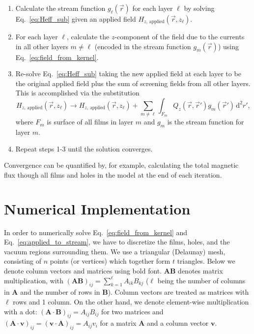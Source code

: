 \documentclass[final,3p,times]{elsarticle}
\begin{document}
\begin{enumerate}
    \item{
        Calculate the stream function $g_\ell(\vec{r})$ for each layer $\ell$ by solving Eq.~\ref{eq:Heff_sub} given an applied field $H_{z,\,\mathrm{applied}}(\vec{r}, z_\ell)$.
    }
    \item{
        For each layer $\ell$, calculate the $z$-component of the field due to the currents in all other layers $m\neq\ell$ (encoded in the stream function $g_m(\vec{r})$)
        using Eq.~\ref{eq:field_from_kernel}.
    }
    \item{
        Re-solve Eq.~\ref{eq:Heff_sub} taking the new applied field at each layer to be the original applied field plus the sum of screening fields from all other layers. This is accomplished via the substitution
        $$
            H_{z,\,\mathrm{applied}}(\vec{r}, z_\ell) \to
            H_{z,\,\mathrm{applied}}(\vec{r}, z_\ell)
            + \sum_{m\neq\ell}
            \int_{F_m} Q_z(\vec{r},\vec{r}')g_m(\vec{r}')\,\mathrm{d}^2r',
        $$
        where $F_m$ is surface of all films in layer $m$ and $g_m$ is the stream function for layer $m$.
    }
    \item{
        Repeat steps 1-3 until the solution converges.
    }
\end{enumerate}

Convergence can be quantified by, for example, calculating the total magnetic flux though all films and holes in the model at the end of each iteration.

\section{Numerical Implementation}
\label{section:implementation}

In order to numerically solve Eq.~\ref{eq:field_from_kernel} and Eq.~\ref{eq:applied_to_stream}, we have to discretize the films, holes, and the vacuum regions surrounding them. We use a triangular
(Delaunay) mesh, consisting of $n$ points (or vertices)
which together form $t$ triangles. Below we denote column vectors and matrices using bold font. $\mathbf{A}\mathbf{B}$
denotes matrix multiplication, with $(\mathbf{A}\mathbf{B})_{ij}=\sum_{k=1}^\ell A_{ik}B_{kj}$
($\ell$ being the number of columns in $\mathbf{A}$ and the number of rows in $\mathbf{B}$). Column vectors are treated as matrices with $\ell$ rows and 1 column. On the other hand, we denote element-wise multiplication with a dot: $(\mathbf{A}\cdot\mathbf{B})_{ij}=A_{ij}B_{ij}$ for two matrices
and $(\mathbf{A}\cdot\mathbf{v})_{ij}=(\mathbf{v}\cdot\mathbf{A})_{ij}=A_{ij}v_{i}$ for a matrix $\mathbf{A}$ and a column vector $\mathbf{v}$.
\end{document}
